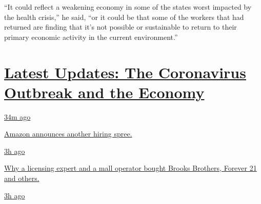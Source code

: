 ``It could reflect a weakening economy in some of the states worst
impacted by the health crisis,'' he said, ``or it could be that some of
the workers that had returned are finding that it's not possible or
sustainable to return to their primary economic activity in the current
environment.''

\hypertarget{latest-updates-the-coronavirus-outbreak-and-the-economy}{%
\section{\texorpdfstring{\href{https://www.nytimes3xbfgragh.onion/live/2020/09/09/business/stock-market-today-coronavirus?action=click\&pgtype=Article\&state=default\&region=MAIN_CONTENT_1\&context=storylines_live_updates}{Latest
Updates: The Coronavirus Outbreak and the
Economy}}{Latest Updates: The Coronavirus Outbreak and the Economy}}\label{latest-updates-the-coronavirus-outbreak-and-the-economy}}

\href{https://www.nytimes3xbfgragh.onion/live/2020/09/09/business/stock-market-today-coronavirus?action=click\&pgtype=Article\&state=default\&region=MAIN_CONTENT_1\&context=storylines_live_updates\#amazon-announces-another-hiring-spree}{34m
ago}

\href{https://www.nytimes3xbfgragh.onion/live/2020/09/09/business/stock-market-today-coronavirus?action=click\&pgtype=Article\&state=default\&region=MAIN_CONTENT_1\&context=storylines_live_updates\#amazon-announces-another-hiring-spree}{Amazon
announces another hiring spree.}

\href{https://www.nytimes3xbfgragh.onion/live/2020/09/09/business/stock-market-today-coronavirus?action=click\&pgtype=Article\&state=default\&region=MAIN_CONTENT_1\&context=storylines_live_updates\#why-a-licensing-expert-and-a-mall-operator-bought-brooks-brothers-forever-21-and-others}{3h
ago}

\href{https://www.nytimes3xbfgragh.onion/live/2020/09/09/business/stock-market-today-coronavirus?action=click\&pgtype=Article\&state=default\&region=MAIN_CONTENT_1\&context=storylines_live_updates\#why-a-licensing-expert-and-a-mall-operator-bought-brooks-brothers-forever-21-and-others}{Why
a licensing expert and a mall operator bought Brooks Brothers, Forever
21 and others.}

\href{https://www.nytimes3xbfgragh.onion/live/2020/09/09/business/stock-market-today-coronavirus?action=click\&pgtype=Article\&state=default\&region=MAIN_CONTENT_1\&context=storylines_live_updates\#lvmh-says-it-is-pulling-out-of-its-16-billion-takeover-of-tiffany}{3h
ago}

